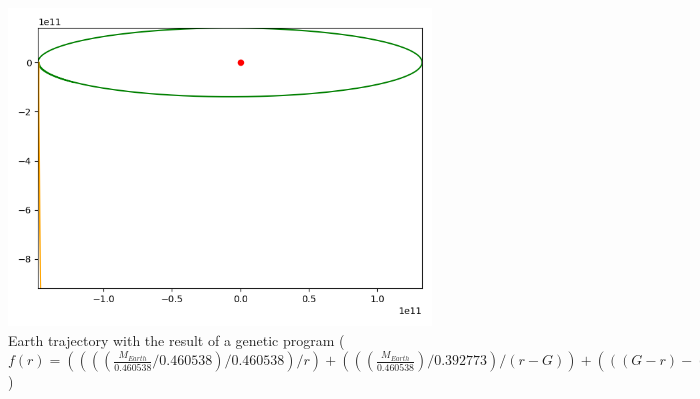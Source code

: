 \begin{figure}
    \center
    \includegraphics[scale=.3]{img/newton_gp_2.png}
    \caption{Earth trajectory with the result of a genetic program (\(f(r) = ((((\frac{M_{Earth}}{0.460538}/0.460538)/0.460538)/r)+(((\frac{M_{Earth}}{0.460538})/0.392773)/(r-G))+(((G-r)-(r+r))+(\frac{M_{Earth}}{0.460538})/(r-G)))))\))}
    \label{gp_3}
\end{figure}